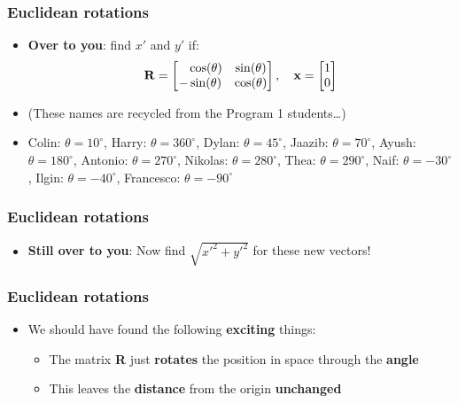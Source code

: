 \documentclass{beamer}
\begin{document}
\begin{frame}
  \frametitle{Euclidean rotations}
  \begin{itemize}
    \item<1-> \textbf{Over to you}: find $x'$ and $y'$ if:
      \begin{align*}
	\mathbf{R}=
	\begin{bmatrix}
	  \hphantom{-}\cos(\theta) & \sin(\theta)\\
	  -\sin(\theta) & \cos(\theta)
	\end{bmatrix}
	, \quad
	\mathbf{x}=
	\begin{bmatrix}
	  1\\
	  0
	\end{bmatrix}
      \end{align*}
    \item<2-> (These names are recycled from the Program 1 students\ldots)
    \item<3-> Colin: $\theta=10^\circ$, Harry: $\theta=360^\circ$, Dylan: $\theta=45^\circ$, Jaazib: $\theta=70^\circ$, Ayush: $\theta=180^\circ$, Antonio: $\theta=270^\circ$, Nikolas: $\theta=280^\circ$, Thea: $\theta=290^\circ$, Naif: $\theta=-30^\circ$, Ilgin: $\theta=-40^\circ$, Francesco: $\theta=-90^\circ$
  \end{itemize}
\end{frame}

\begin{frame}
  \frametitle{Euclidean rotations}
  \begin{itemize}
    \item<1-> \textbf{Still over to you}: Now find $\sqrt{x'^2+y'^2}$ for these new vectors!
  \end{itemize}
\end{frame}

\begin{frame}
  \frametitle{Euclidean rotations}
  \begin{itemize}
    \item<1-> We should have found the following \textbf{exciting} things:
      \begin{itemize}
	\item<2-> The matrix \textbf{R} just \textbf{rotates} the position in space through the \textbf{angle}
	\item<3-> This leaves the \textbf{distance} from the origin \textbf{unchanged}
      \end{itemize}
  \end{itemize}
\end{frame}
\end{document}
